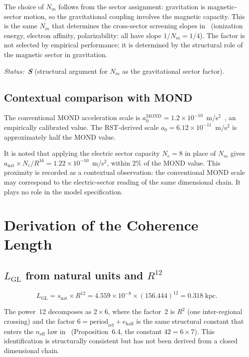 \documentclass[11pt,a4paper]{article}
\begin{document}
The choice of $N_m$ follows from the sector assignment: gravitation is magnetic-sector motion, so the gravitational coupling involves the magnetic capacity.
This is the same $N_m$ that determines the cross-sector screening slopes in~\cite{Wells2026b} (ionization energy, electron affinity, polarizability: all have slope $1/N_m = 1/4$).
The factor is not selected by empirical performance; it is determined by the structural role of the magnetic sector in gravitation.

\textit{Status:~\textbf{S}} (structural argument for $N_m$ as the gravitational sector factor).

\subsection{Contextual comparison with MOND}
\label{sec:mond-context}

The conventional MOND acceleration scale is $a_0^{\mathrm{MOND}} = 1.2 \times 10^{-10}$~m/s$^2$~\cite{Milgrom1983}, an empirically calibrated value.
The RST-derived scale $a_0 = 6.12 \times 10^{-11}$~m/s$^2$ is approximately half the MOND value.

It is noted that applying the electric sector capacity $N_e = 8$ in place of $N_m$ gives $a_{\mathrm{nat}} \times N_e / R^{16} = 1.22 \times 10^{-10}$~m/s$^2$, within 2\% of the MOND value.
This proximity is recorded as a contextual observation: the conventional MOND scale may correspond to the electric-sector reading of the same dimensional chain.
It plays no role in the model specification.

\section{Derivation of the Coherence Length}
\label{sec:coherence}

\subsection{$L_{\mathrm{GL}}$ from natural units and $R^{12}$}

\begin{equation}
\label{eq:LGL}
L_{\mathrm{GL}} = s_{\mathrm{nat}} \times R^{12} = 4.559 \times 10^{-8} \times (156.444)^{12} = 0.318 \;\text{kpc}.
\end{equation}

The power~12 decomposes as $2 \times 6$, where the factor~2 is $R^2$ (one inter-regional crossing) and the factor $6 = \mathrm{period}_{\mathrm{ref}} + e_{\mathrm{half}}$ is the same structural constant that enters the $n_{\mathrm{eff}}$ law in~\cite{Wells2026b} (Proposition~6.4, the constant $42 = 6 \times 7$).
This identification is structurally consistent but has not been derived from a closed dimensional chain.
\end{document}
